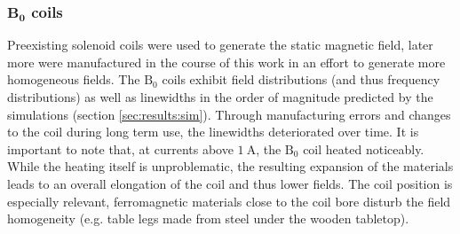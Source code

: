         \subsubsection{$\mathbf{B_0}$ coils}
        Preexisting solenoid coils were used to generate the static magnetic field, later more were manufactured in the course of this work in an effort to generate more homogeneous fields. The $\mathrm{B_0}$ coils exhibit field distributions (and thus frequency distributions) as well as  linewidths in the order of magnitude predicted by the simulations (section \ref{sec:results:sim}). Through manufacturing errors and changes to the coil during long term use, the linewidths deteriorated over time. It is important to note that, at currents above $\SI{1}{\ampere}$, the $\mathrm{B_0}$ coil heated noticeably. While the heating itself is unproblematic, the resulting expansion of the materials leads to an overall elongation of the coil and thus lower fields. The coil position is especially relevant, ferromagnetic materials close to the coil bore disturb the field homogeneity (e.g. table legs made from steel under the wooden tabletop).
